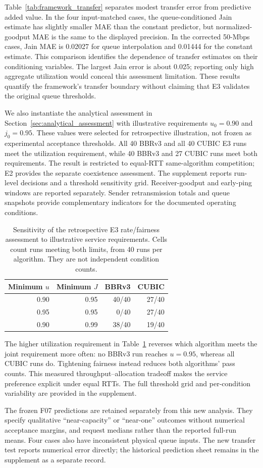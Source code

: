Table~\ref{tab:framework_transfer} separates modest transfer error from
predictive added value. In the four input-matched cases, the queue-conditioned
Jain estimate has slightly smaller MAE than the constant predictor, but
normalized-goodput MAE is the same to the displayed precision. In the corrected 50-Mbps cases, Jain MAE is 0.02027 for queue
interpolation and 0.01444 for the constant estimate. This comparison
identifies the dependence of transfer estimates on their conditioning
variables. The largest Jain error is about
0.025; reporting only high aggregate utilization would conceal this
assessment limitation. These results quantify the framework's transfer
boundary without claiming that E3 validates the original queue thresholds.

We also instantiate the analytical assessment in
Section~\ref{sec:analytical_assessment} with illustrative requirements
$u_0=0.90$ and $j_0=0.95$. These values were selected for retrospective
illustration, not frozen as experimental acceptance thresholds. All 40
BBRv3 and all 40 CUBIC E3 runs meet the utilization requirement, while
40 BBRv3 and 27 CUBIC runs meet both requirements. The result is restricted
to equal-RTT same-algorithm competition; E2 provides the separate coexistence
assessment. The supplement reports
run-level decisions and a threshold sensitivity grid. Receiver-goodput and early-ping windows are reported separately. Sender
retransmission totals and queue snapshots provide complementary indicators
for the documented operating conditions.

\begin{table}[htbp]
\centering
\small
\caption{Sensitivity of the retrospective E3 rate/fairness assessment to
illustrative service requirements. Cells count runs meeting both limits,
from 40 runs per algorithm. They are not independent condition counts.}
\label{tab:assessment_requirements}
\begin{tabular}{rrrr}
\toprule
Minimum $u$ & Minimum $J$ & BBRv3 & CUBIC \\
\midrule
0.90 & 0.95 & 40/40 & 27/40 \\
0.95 & 0.95 & 0/40 & 27/40 \\
0.90 & 0.99 & 38/40 & 19/40 \\
\bottomrule
\end{tabular}
\end{table}

The higher utilization requirement in Table~\ref{tab:assessment_requirements}
reverses which algorithm meets the joint requirement more often: no
BBRv3 run reaches $u=0.95$, whereas all CUBIC runs do. Tightening fairness
instead reduces both algorithms' pass counts. This measured throughput--allocation tradeoff makes the service
preference explicit under equal RTTs. The full
threshold grid and per-condition variability are provided in the supplement.

The frozen F07 predictions are retained separately from this new analysis.
They specify qualitative ``near-capacity'' or ``near-one'' outcomes without
numerical acceptance margins, and request medians rather than the reported
full-run means. Four cases also have inconsistent physical queue inputs.
The new transfer test reports numerical error directly; the historical
prediction sheet remains in the supplement as a separate record.
